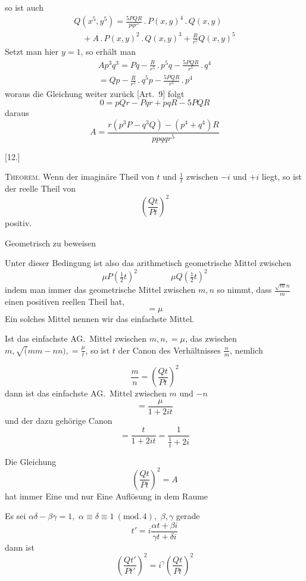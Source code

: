 so ist auch
\[
\begin{gathered}
Q(x^5,y^5)
=\frac{5PQR}{pqr^5}\, .\,P(x,y)^4\, .\,Q(x,y)\\[8pt]
\quad+A\, .\,P(x,y)^2\, .\,Q(x,y)^3
+\frac{R}{r^5}Q(x,y)^5
\end{gathered}
\]
Setzt man hier \(y=1\), so erhält man
\[
\begin{gathered}
Ap^3q^3=Pq-\frac{R}{r^5}\, .\,p^5q
-\frac{5PQR}{r^5}\, .\,q^4\\[8pt]
=Qp-\frac{R}{r^5}\, .\,q^5p
-\frac{5PQR}{r^5}\, .\,p^4
\end{gathered}
\]
woraus die Gleichung weiter zurück [Art.\ 9] folgt
\[
0=pQr-Pqr+pqR-5PQR
\]
daraus
\[
A=\frac{r(p^3P-q^3Q)-(p^4+q^4)R}{ppqqr^5}
\]
\par\medskip{}\centerline{[12.]}\nobreak\smallskip
\textsc{Theorem.} Wenn der imaginäre Theil von \(t\) und \(\frac1t\) zwischen \(-i\) und
\(+i\) liegt, so ist der reelle Theil von
\[
\left(\frac{Qt}{Pt}\right)^2
\]
positiv.

\noindent\begin{minipage}{.45\linewidth}
Geometrisch zu beweisen
\end{minipage}\hfill
\resizebox{.47\linewidth}{!}{}

Unter dieser Bedingung ist also das arithmetisch geometrische Mittel zwischen
\[
\mu P(\tfrac12t)^2\qquad\qquad\mu Q(\tfrac12t)^2
\]
indem man immer das geometrische Mittel zwischen \(m,n\) so nimmt, dass
\(\frac{\surd mn}{m}\) einen positiven reellen Theil hat,
\[
=\mu
\]
Ein solches Mittel nennen wir das einfachste Mittel.

Ist das einfachste AG.\ Mittel zwischen \(m,n,=\mu\), das zwischen
\(m,\surd(mm-nn),=\frac\mu t\), so ist \(t\) der Canon des Verhältnisses
\(\frac nm\), nemlich

\[
\frac mn=\left(\frac{Qt}{Pt}\right)^2
\]
dann ist das einfachste AG.\ Mittel zwischen \(m\) und \(-n\)
\[
=\frac\mu{1+2it}
\]
und der dazu gehörige Canon
\[
=\frac t{1+2it}=\frac1{\frac1t+2i}
\]

Die Gleichung
\[
\left(\frac{Qt}{Pt}\right)^2=A
\]
hat immer Eine und nur Eine Auflösung in dem Raume
\begin{center}
\resizebox{.48\linewidth}{!}{}
\end{center}

Es sei \(\alpha\delta-\beta\gamma=1,\)
\(\alpha\equiv\delta\equiv1\ (\mathrm{mod.}\,4),\)
\(\beta,\gamma\) gerade
\[
t'=i\frac{\alpha t+\beta i}{\gamma t+\delta i}
\]
dann ist
\[
\left(\frac{Qt'}{Pt'}\right)^2=i^\gamma\left(\frac{Qt}{Pt}\right)^2
\]

